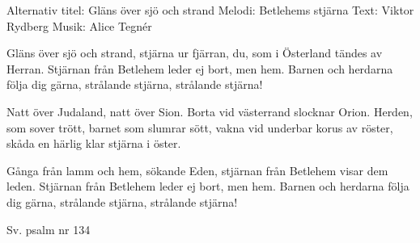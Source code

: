 \begin{song}

\begin{songmeta}
Alternativ titel: Gläns över sjö och strand
Melodi: Betlehems stjärna
Text: Viktor Rydberg
Musik: Alice Tegnér
\end{songmeta}

\begin{songtext}
Gläns över sjö och strand, stjärna ur fjärran,
du, som i Österland tändes av Herran.
Stjärnan från Betlehem
leder ej bort, men hem.
Barnen och herdarna följa dig gärna,
strålande stjärna, strålande stjärna!

Natt över Judaland, natt över Sion.
Borta vid västerrand slocknar Orion.
Herden, som sover trött,
barnet som slumrar sött,
vakna vid underbar korus av röster,
skåda en härlig klar stjärna i öster.

Gånga från lamm och hem, sökande Eden,
stjärnan från Betlehem visar dem leden.
Stjärnan från Betlehem
leder ej bort, men hem.
Barnen och herdarna följa dig gärna,
strålande stjärna, strålande stjärna!
\end{songtext}

\begin{songnotes}
Sv. psalm nr 134
\end{songnotes}
\end{song}
